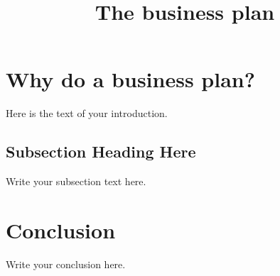\documentclass{article}
\begin{document}
\title{The business plan}


\maketitle


\section{Why do a business plan?}
Here is the text of your introduction.








\subsection{Subsection Heading Here}
Write your subsection text here.



\section{Conclusion}
Write your conclusion here.
\end{document}
